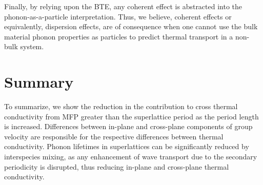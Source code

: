 \documentclass[aps,prb,preprint,preprintnumbers,amsmath,amssymb,floatfix,superscriptaddress]{revtex4}
\begin{document}
Finally, by relying upon the BTE, any coherent effect is abstracted into the phonon-as-a-particle interpretation. Thus, we believe, coherent effects or equivalently, dispersion effects, are of consequence when one cannot use the bulk material phonon properties as particles to predict thermal transport in a non-bulk system.

\section{Summary}

To summarize, we show the reduction in the contribution to cross thermal conductivity from MFP greater than the superlattice period as the period length is increased. Differences between in-plane and cross-plane components of group velocity are responsible for the respective differences between thermal conductivity. Phonon lifetimes in superlattices can be significantly reduced by interspecies mixing, as any enhancement of wave transport due to the secondary periodicity is disrupted, thus reducing in-plane and cross-plane thermal conductivity.

\newpage
%

\end{document}
